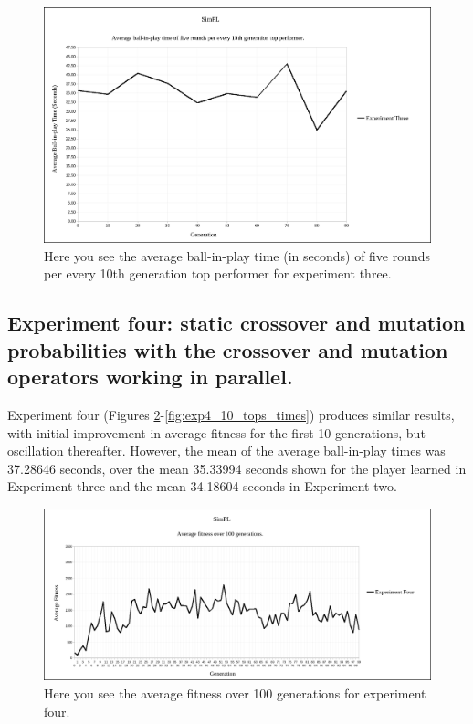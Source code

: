 \documentclass[a4paper,10pt]{article}
\begin{document}
\begin{figure}[H]  
  \centering
  \includegraphics[width=1\textwidth]{figures/exp3_10_tops_times.png}
  \caption{Here you see the average ball-in-play time (in seconds) of five rounds per every 10th generation top performer for experiment three.}
  \label{fig:exp3_10_tops_times}
\end{figure}

\subsection{Experiment four: static crossover and mutation probabilities with the crossover and mutation operators working in parallel.}

Experiment four (Figures \ref{fig:exp4_avg_fit}-\ref{fig:exp4_10_tops_times}) produces similar results, with initial improvement in average fitness for the first 10 generations, but oscillation thereafter. However, the mean of the average ball-in-play times was 37.28646 seconds, over the mean 35.33994 seconds shown for the player learned in Experiment three and the mean 34.18604 seconds in Experiment two.

\begin{figure}[H]  
  \centering
  \includegraphics[width=1\textwidth]{figures/exp4_avg_fit.png}
  \caption{Here you see the average fitness over 100 generations for experiment four.}
  \label{fig:exp4_avg_fit}
\end{figure}
\end{document}
